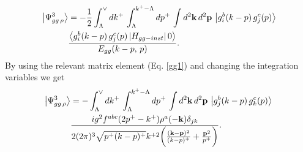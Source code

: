 \documentclass[a4paper,11pt]{article}
\def\v#1{\mathbf{#1}}
\begin{document}
\begin{figure}[htbp]
\centering
\end{figure}
\begin{align}\label{ggthree}
\left|\Psi_{gg\,\rho}^{3}\right\rangle & = -\frac{1}{2}\int_{\Lambda}^{\vee}dk^{+}\,\int_{\Lambda}^{k^{+}-\Lambda}dp^{+}\,\int d^{2}\mathbf{k}\, d^{2}\mathbf{p}\,\left|g_{i}^{b}(k-p)\, g_{j}^{c}(p)\right\rangle\notag \\ &  \frac{\left\langle g_{i}^{b}(k-p)\, g_{j}^{c}(p)\left|H_{gg-inst}\right|0\right\rangle }{E_{gg}(k-p,\, p)}.
\end{align}
By using the relevant matrix element (Eq. \eqref{gg1}) and changing the integration variables we get
\begin{align}\label{instgg3}
\left|\Psi_{gg\,\rho}^{3}\right\rangle & =  -\int_{\Lambda}^{\vee}dk^{+}\,\int_{\Lambda}^{k^{+}-\Lambda}dp^{+}\,\int d^{2}\mathbf{k}\, d^{2}\mathbf{p}\, \left|g_{j}^{b}(k-p)\, g_{k}^{c}(p)\right\rangle \, \notag \\ & \frac{ig^{2}f^{abc}(2p^{+}-k^{+})\rho^{a}(-\v{k})\delta_{jk}}{2(2\pi)^{3}\sqrt{p^{+}(k-p)^{+}}k^{+ 2}\bigg(\frac{(\v{k-p})^{2}}{(k-p)^{+}}+\frac{\v{p}^{2}}{p^{+}}\bigg)}.
\end{align}
\end{document}
